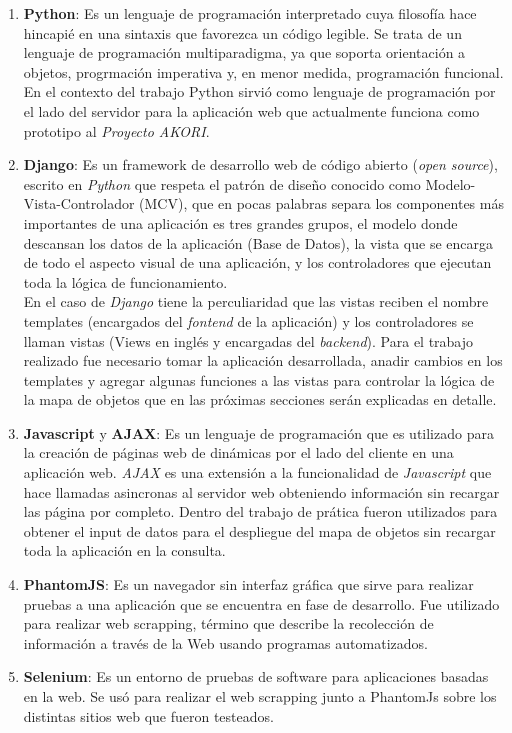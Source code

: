			\begin{enumerate}
				\item \textbf{Python}: Es un lenguaje de programación interpretado cuya filosofía 
				hace hincapié en una sintaxis que favorezca un código legible. Se trata de un 
				lenguaje de programación multiparadigma, ya que soporta orientación a objetos, 
				progrmación imperativa y, en menor medida, programación funcional. En el contexto 
				del trabajo Python sirvió como lenguaje de programación por el lado del servidor 
				para la aplicación web que actualmente funciona como prototipo al \textit{Proyecto AKORI}. 
				\item \textbf{Django}: Es un framework de desarrollo web de código abierto (\textit{open source}), escrito en \textit{Python} que respeta el patrón de diseño conocido como 
				Modelo-Vista-Controlador (MCV), que en pocas palabras separa los componentes más 
				importantes de una aplicación es tres grandes grupos, el modelo donde descansan los
				datos de la aplicación (Base de Datos), la vista que se encarga de todo el aspecto 
				visual de una aplicación, y los controladores que ejecutan toda la lógica de
				funcionamiento. \\ 
				En el caso de \textit{Django} tiene la perculiaridad que las vistas reciben el 
				nombre templates (encargados del \textit{fontend} de la aplicación) y los 
				controladores se llaman vistas (Views en inglés y encargadas del \textit{backend}). 	
				Para el trabajo realizado fue necesario tomar la aplicación desarrollada, anadir
				cambios en los templates y agregar algunas funciones a las vistas para controlar 
				la lógica de la mapa de objetos que en las próximas secciones serán explicadas en 
				detalle.
				\item \textbf{Javascript} y \textbf{AJAX}: Es un lenguaje de programación que 
				es utilizado para la creación de páginas web de dinámicas por el lado del cliente
				en una aplicación web. \textit{AJAX} es una extensión a la funcionalidad de 
				\textit{Javascript} que hace llamadas asincronas al servidor web obteniendo 
				información sin recargar las página por completo. Dentro del trabajo de prática
				fueron utilizados para obtener el input de datos para el despliegue del mapa de 
				objetos sin recargar toda la aplicación en la consulta. 
				\item \textbf{PhantomJS}: Es un navegador sin interfaz gráfica que sirve para 
				realizar pruebas a una aplicación que se encuentra en fase de desarrollo. Fue 
				utilizado para realizar web scrapping, término que describe la recolección de 
				información a través de la Web usando programas automatizados.
				\item \textbf{Selenium}: Es un entorno de pruebas de software para aplicaciones 
				basadas en la web. Se usó para realizar el web scrapping junto a PhantomJs sobre
				los distintas sitios web que fueron testeados.
			\end{enumerate}
